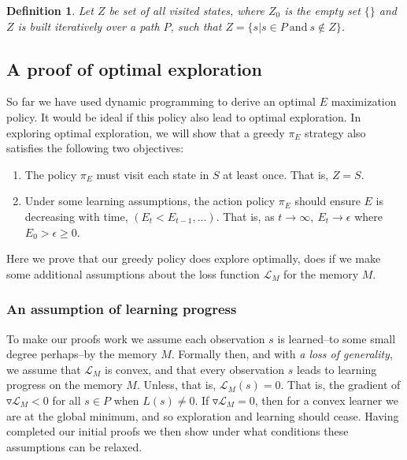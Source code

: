 \documentclass[9pt,twocolumn,twoside]{pnas-new}
\newtheorem{definition}{Definition}
\begin{document}
\begin{definition}
    Let $Z$ be set of all visited states, where $Z_0$ is the empty set $\{\}$ and $Z$ is built iteratively over a path $P$, such that $Z = \{s | s \in P\ \text{and}\ s \not\in Z\}$.    
\end{definition}

\subsection*{A proof of optimal exploration}
So far we have used dynamic programming to derive an optimal $E$ maximization policy. It would be ideal if this policy also lead to optimal exploration. In exploring optimal exploration, we will show that a greedy $\pi_E$ strategy also satisfies the following two objectives:

\begin{enumerate}[noitemsep,wide=0pt,leftmargin=\dimexpr\labelwidth+2\labelsep\relax]
    \item The policy $\pi_E$ must visit each state in $S$ at least once. That is, $Z = S$.
    \item Under some learning assumptions, the action policy $\pi_E$ should ensure $E$ is decreasing with time, $(E_t < E_{t-1}, ...)$. That is, as $t \rightarrow \infty,\ E_t \rightarrow \epsilon$ where $E_0 > \epsilon \geq 0$.
\end{enumerate}

Here we prove that our greedy policy does explore optimally, does if we make some additional assumptions about the loss function $\mathcal{L}_M$ for the memory $M$. 

\subsubsection*{An assumption of learning progress}
To make our proofs work we assume each observation $s$ is learned--to some small degree perhaps--by the memory $M$. Formally then, and with \textit{a loss of generality}, we assume that $\mathcal{L}_M$ is convex, and that every observation $s$ leads to learning progress on the memory $M$. Unless, that is, $\mathcal{L}_M(s) = 0$. That is, the gradient of $\triangledown \mathcal{L}_M < 0$ for all $s \in P$ when $L(s) \neq 0$. If $\triangledown \mathcal{L}_M = 0$, then for a convex learner we are at the global minimum, and so exploration and learning should cease. Having completed our initial proofs we then show under what conditions these assumptions can be relaxed.
\end{document}

